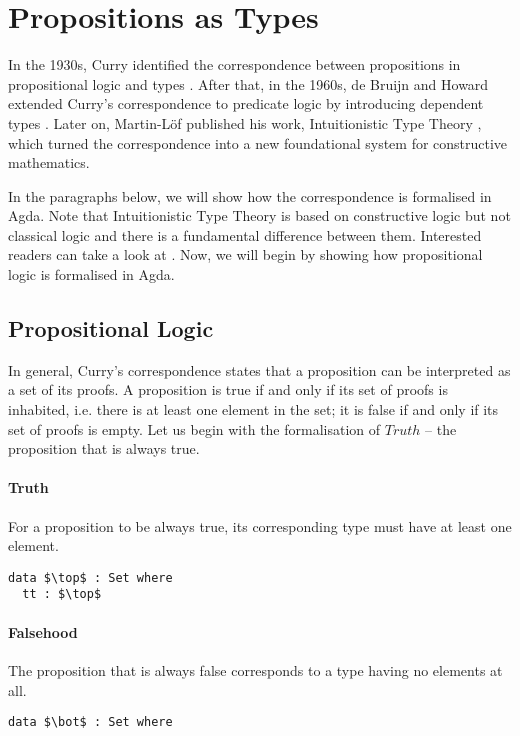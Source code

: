 \section{Propositions as Types}
\par In the 1930s, Curry identified the
correspondence between propositions in propositional logic and types
\cite{curry1934}. After that, in the 1960s, de Bruijn and Howard extended
Curry's correspondence to predicate logic by introducing dependent
types \cite{bruijn1968, howard1969}. Later on, Martin-L\"of published
his work, Intuitionistic Type Theory \cite{martin1984}, which turned the correspondence into a new
foundational system for constructive mathematics. 

\par In the paragraphs below, we will show how the correspondence is
formalised in Agda. Note that Intuitionistic Type
Theory is based on constructive logic but not classical logic and there
is a fundamental difference between them. Interested readers can take a look at
\cite{avigad2000}. Now, we will begin by showing how propositional
logic is formalised in Agda. 

\subsection{Propositional Logic} 
\par In general, Curry's correspondence
states that a proposition can be interpreted as a set of its proofs. A
proposition is true if and only if its set of proofs is inhabited,
i.e. there is at least one element in the set; it is false if and only
if its set of proofs is empty. Let us begin with the formalisation of
\(Truth\) -- the proposition that is always true. 

\paragraph{Truth} For a proposition to be always true, its
corresponding type must have at least one element. 
\begin{lstlisting}[mathescape=true,xleftmargin=.3\textwidth]
data $\top$ : Set where
  tt : $\top$
\end{lstlisting} 

\paragraph{Falsehood} The proposition that is always
false corresponds to a type having no elements at all. 
\begin{lstlisting}[mathescape=true,xleftmargin=.3\textwidth]
data $\bot$ : Set where
\end{lstlisting} 

